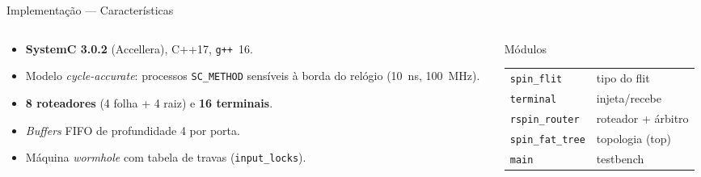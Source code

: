\documentclass[aspectratio=169]{beamer}
\begin{document}
\begin{frame}{Implementação --- Características}
  \begin{columns}[T]
    \begin{column}{0.54\textwidth}
      \begin{itemize}
        \item \textbf{SystemC 3.0.2} (Accellera), C++17, \texttt{g++}~16.
        \item Modelo \emph{cycle-accurate}: processos \texttt{SC\_METHOD}
        sensíveis à borda do relógio (\SI{10}{ns}, \SI{100}{MHz}).
        \item \textbf{8 roteadores} (4 folha + 4 raiz) e \textbf{16 terminais}.
        \item \emph{Buffers} FIFO de profundidade 4 por porta.
        \item Máquina \emph{wormhole} com tabela de travas
        (\texttt{input\_locks}).
      \end{itemize}
    \end{column}
    \begin{column}{0.46\textwidth}
      \footnotesize
      \begin{block}{Módulos}
        \begin{tabular}{@{}ll@{}}
          \texttt{spin\_flit}    & tipo do flit \\
          \texttt{terminal}      & injeta/recebe \\
          \texttt{rspin\_router} & roteador + árbitro \\
          \texttt{spin\_fat\_tree} & topologia (top) \\
          \texttt{main}          & testbench \\
        \end{tabular}
      \end{block}
    \end{column}
  \end{columns}
\end{frame}
\end{document}
